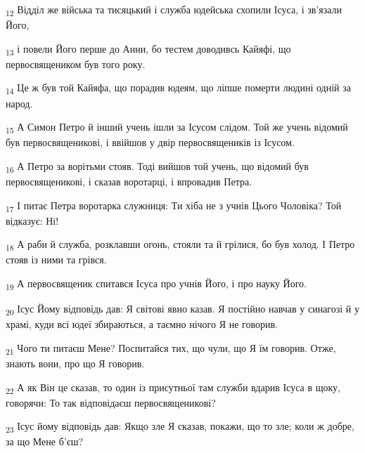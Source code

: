 \begin{tcolorbox}
\textsubscript{12} Відділ же війська та тисяцький і служба юдейська схопили Ісуса, і зв'язали Його,
\end{tcolorbox}
\begin{tcolorbox}
\textsubscript{13} і повели Його перше до Анни, бо тестем доводивсь Кайяфі, що первосвящеником був того року.
\end{tcolorbox}
\begin{tcolorbox}
\textsubscript{14} Це ж був той Кайяфа, що порадив юдеям, що ліпше померти людині одній за народ.
\end{tcolorbox}
\begin{tcolorbox}
\textsubscript{15} А Симон Петро й інший учень ішли за Ісусом слідом. Той же учень відомий був первосвященикові, і ввійшов у двір первосвящеників із Ісусом.
\end{tcolorbox}
\begin{tcolorbox}
\textsubscript{16} А Петро за ворітьми стояв. Тоді вийшов той учень, що відомий був первосвященикові, і сказав воротарці, і впровадив Петра.
\end{tcolorbox}
\begin{tcolorbox}
\textsubscript{17} І питає Петра воротарка служниця: Ти хіба не з учнів Цього Чоловіка? Той відказує: Ні!
\end{tcolorbox}
\begin{tcolorbox}
\textsubscript{18} А раби й служба, розклавши огонь, стояли та й грілися, бо був холод. І Петро стояв із ними та грівся.
\end{tcolorbox}
\begin{tcolorbox}
\textsubscript{19} А первосвященик спитався Ісуса про учнів Його, і про науку Його.
\end{tcolorbox}
\begin{tcolorbox}
\textsubscript{20} Ісус Йому відповідь дав: Я світові явно казав. Я постійно навчав у синагозі й у храмі, куди всі юдеї збираються, а таємно нічого Я не говорив.
\end{tcolorbox}
\begin{tcolorbox}
\textsubscript{21} Чого ти питаєш Мене? Поспитайся тих, що чули, що Я їм говорив. Отже, знають вони, про що Я говорив.
\end{tcolorbox}
\begin{tcolorbox}
\textsubscript{22} А як Він це сказав, то один із присутньої там служби вдарив Ісуса в щоку, говорячи: То так відповідаєш первосвященикові?
\end{tcolorbox}
\begin{tcolorbox}
\textsubscript{23} Ісус йому відповідь дав: Якщо зле Я сказав, покажи, що то зле; коли ж добре, за що Мене б'єш?
\end{tcolorbox}
